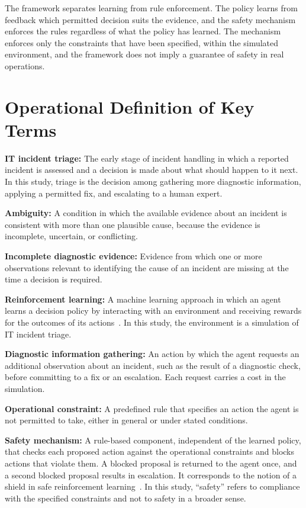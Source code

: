 The framework separates learning from rule enforcement. The policy learns from feedback which permitted decision suits the evidence, and the safety mechanism enforces the rules regardless of what the policy has learned. The mechanism enforces only the constraints that have been specified, within the simulated environment, and the framework does not imply a guarantee of safety in real operations.

\section{Operational Definition of Key Terms}

\textbf{IT incident triage:} The early stage of incident handling in which a reported incident is assessed and a decision is made about what should happen to it next. In this study, triage is the decision among gathering more diagnostic information, applying a permitted fix, and escalating to a human expert.

\textbf{Ambiguity:} A condition in which the available evidence about an incident is consistent with more than one plausible cause, because the evidence is incomplete, uncertain, or conflicting.

\textbf{Incomplete diagnostic evidence:} Evidence from which one or more observations relevant to identifying the cause of an incident are missing at the time a decision is required.

\textbf{Reinforcement learning:} A machine learning approach in which an agent learns a decision policy by interacting with an environment and receiving rewards for the outcomes of its actions~\cite{sutton2018}. In this study, the environment is a simulation of IT incident triage.

\textbf{Diagnostic information gathering:} An action by which the agent requests an additional observation about an incident, such as the result of a diagnostic check, before committing to a fix or an escalation. Each request carries a cost in the simulation.

\textbf{Operational constraint:} A predefined rule that specifies an action the agent is not permitted to take, either in general or under stated conditions.

\textbf{Safety mechanism:} A rule-based component, independent of the learned policy, that checks each proposed action against the operational constraints and blocks actions that violate them. A blocked proposal is returned to the agent once, and a second blocked proposal results in escalation. It corresponds to the notion of a shield in safe reinforcement learning~\cite{alshiekh2018}. In this study, ``safety'' refers to compliance with the specified constraints and not to safety in a broader sense.

